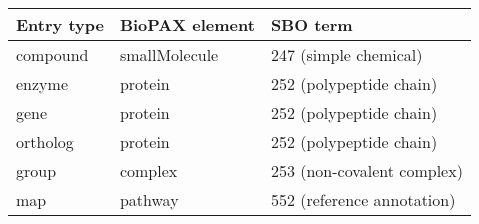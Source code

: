 \begin{tabular}{lll}
\toprule

Entry type & BioPAX element & SBO term \\
\midrule
\rowcolor{tableShade2}
compound & smallMolecule & 247 (simple chemical) \\
enzyme & protein & 252 (polypeptide chain) \\
\rowcolor{tableShade2}
gene & protein & 252 (polypeptide chain) \\
ortholog & protein & 252 (polypeptide chain) \\
\rowcolor{tableShade2}
group & complex & 253 (non-covalent complex) \\
map & pathway & 552 (reference annotation) \\

\bottomrule
\end{tabular}
